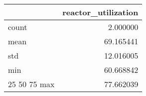 \begin{tabular}{lr}
\toprule
 & reactor\_utilization \\
\midrule
count & 2.000000 \\
mean & 69.165441 \\
std & 12.016005 \\
min & 60.668842 \\
25%
50%
75%
max & 77.662039 \\
\bottomrule
\end{tabular}

